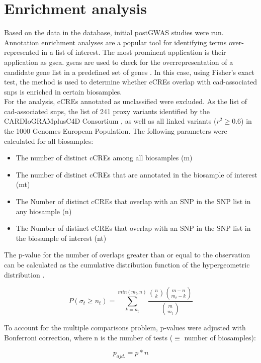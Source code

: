 \section{Enrichment analysis}
\label{sec:enrichment}
Based on the data in the database, initial postGWAS studies were run. Annotation enrichment analyses are a popular tool for identifying terms over-represented in a list of interest. The most prominent application is their application as \ac{gsea}. \Acp{gsea} are used to check for the overrepresentation of a candidate gene list in a predefined set of genes \cite{tipneyIntroductionEffectiveUse2010}. In this case, using Fisher's exact test, the method is used to determine whether \acp{cCRE} overlap with \ac{cad}-associated \acp{snp} is enriched in certain biosamples.\\
For the analysis, \acp{cCRE} annotated as unclassified were excluded. As the list of \ac{cad}-associated \acp{snp}, the list of 241 proxy variants identified by the CARDIoGRAMplusC4D Consortium \cite{aragamDiscoverySystematicCharacterization2021s}, as well as all linked variants ($r^2\geq0.6$) in the 1000 Genomes European Population. The following parameters were calculated for all biosamples:

\begin{itemize}
    \item The number of distinct \acp{cCRE} among all biosamples (m)
    \item The number of distinct \acp{cCRE} that are annotated in the biosample of interest (mt)
    \item The Number of distinct \acp{cCRE} that overlap with an SNP in the SNP list in any biosample (n)
    \item The Number of distinct \acp{cCRE} that overlap with an SNP in the SNP list in the biosample of interest (nt)
\end{itemize}

The p-value for the number of overlaps greater than or equal to the observation can be calculated as the cumulative distribution function of the hypergeometric distribution \cite{virtanenSciPyFundamentalAlgorithms2020}.

$$ P(\sigma_t\geq n_t) = \sum_{k=n_t}^{min(m_t, n)} \frac{\binom{n}{k}\binom{m-n}{m_t-k}}{\binom{m}{m_t}} $$

To account for the multiple comparisons problem, p-values were adjusted with Bonferroni correction, where n is the number of tests ($\equiv$ number of biosamples):

$$ p_{ajd.} = p*n$$

